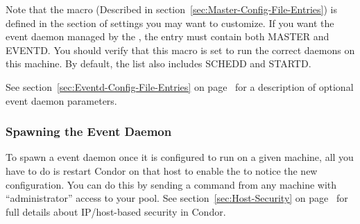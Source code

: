 Note that the  macro (Described in
section~\ref{sec:Master-Config-File-Entries}) is defined in the
section of settings you may want to customize.
If you want the event daemon managed by the , the
 entry must contain both MASTER and EVENTD.
You should verify that this macro is set to run the correct daemons on
this machine.  By default, the list also includes SCHEDD and STARTD.

See section~\ref{sec:Eventd-Config-File-Entries} on
page~\pageref{sec:Eventd-Config-File-Entries} for a description of
optional event daemon parameters.

\subsubsection{\label{sec:Spawn-EventD} 
Spawning the Event Daemon} 

To spawn a event daemon once it is configured to run on a given
machine, all you have to do is restart Condor on that host to enable
the  to notice the new configuration.
You can do this by sending a  command from any machine
with ``administrator'' access to your pool.
See section~\ref{sec:Host-Security} on
page~\pageref{sec:Host-Security} for full details about IP/host-based
security in Condor.

